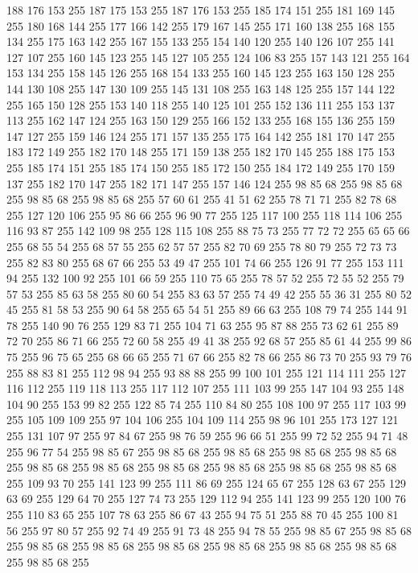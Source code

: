 188 176 153 255 187 175 153 255 187 176 153 255 185 174 151 255 181 169 145 255 180 168 144 255 177 166 142 255 179 167 145 255 171 160 138 255 168 155 134 255 175 163 142 255 167 155 133 255 154 140 120 255 140 126 107 255 141 127 107 255 160 145 123 255 145 127 105 255 124 106 83 255 157 143 121 255 164 153 134 255 158 145 126 255 168 154 133 255 160 145 123 255 163 150 128 255 144 130 108 255 147 130 109 255 145 131 108 255 163 148 125 255 157 144 122 255 165 150 128 255 153 140 118 255 140 125 101 255 152 136 111 255 153 137 113 255 162 147 124 255 163 150 129 255 166 152 133 255 168 155 136 255 159 147 127 255 159 146 124 255 171 157 135 255 175 164 142 255 181 170 147 255 183 172 149 255 182 170 148 255 171 159 138 255 182 170 145 255 188 175 153 255 185 174 151 255 185 174 150 255 185 172 150 255 184 172 149 255 170 159 137 255 182 170 147 255 182 171 147 255 157 146 124 255 98 85 68 255 98 85 68 255 98 85 68 255 98 85 68 255 57 60 61 255 41 51 62 255 78 71 71 255 82 78 68 255
127 120 106 255 95 86 66 255 96 90 77 255 125 117 100 255 118 114 106 255 116 93 87 255 142 109 98 255 128 115 108 255 88 75 73 255 77 72 72 255 65 65 66 255 68 55 54 255 68 57 55 255 62 57 57 255 82 70 69 255 78 80 79 255 72 73 73 255 82 83 80 255 68 67 66 255 53 49 47 255 101 74 66 255 126 91 77 255 153 111 94 255 132 100 92 255 101 66 59 255 110 75 65 255 78 57 52 255 72 55 52 255 79 57 53 255 85 63 58 255 80 60 54 255 83 63 57 255 74 49 42 255 55 36 31 255 80 52 45 255 81 58 53 255 90 64 58 255 65 54 51 255 89 66 63 255 108 79 74 255 144 91 78 255 140 90 76 255 129 83 71 255 104 71 63 255 95 87 88 255 73 62 61 255 89 72 70 255 86 71 66 255 72 60 58 255 49 41 38 255 92 68 57 255 85 61 44 255 99 86 75 255 96 75 65 255 68 66 65 255 71 67 66 255 82 78 66 255 86 73 70 255 93 79 76 255 88 83 81 255 112 98 94 255 93 88 88 255 99 100 101 255 121 114 111 255
127 116 112 255 119 118 113 255 117 112 107 255 111 103 99 255 147 104 93 255 148 104 90 255 153 99 82 255 122 85 74 255 110 84 80 255 108 100 97 255 117 103 99 255 105 109 109 255 97 104 106 255 104 109 114 255 98 96 101 255 173 127 121 255 131 107 97 255 97 84 67 255 98 76 59 255 96 66 51 255 99 72 52 255 94 71 48 255 96 77 54 255 98 85 67 255 98 85 68 255 98 85 68 255 98 85 68 255 98 85 68 255 98 85 68 255 98 85 68 255 98 85 68 255 98 85 68 255 98 85 68 255 98 85 68 255 109 93 70 255 141 123 99 255 111 86 69 255 124 65 67 255 128 63 67 255 129 63 69 255 129 64 70 255 127 74 73 255 129 112 94 255 141 123 99 255 120 100 76 255 110 83 65 255 107 78 63 255 86 67 43 255 94 75 51 255 88 70 45 255 100 81 56 255 97 80 57 255 92 74 49 255 91 73 48 255 94 78 55 255 98 85 67 255 98 85 68 255 98 85 68 255 98 85 68 255 98 85 68 255 98 85 68 255 98 85 68 255 98 85 68 255 98 85 68 255
